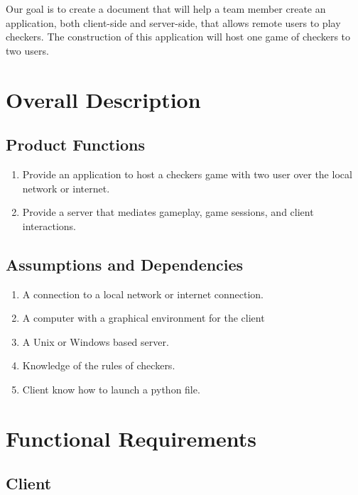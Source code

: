 \documentclass[10pt]{article}
\begin{document}
Our goal is to create a document that will help a team member create an application, 
both client-side and server-side, that allows remote users to play checkers. The construction of this application will host one game of checkers to two users. 
\section{Overall Description}

\subsection{Product Functions}

\begin{enumerate}
    \item Provide an application to host a checkers game with two user over the local network or internet.
    \item Provide a server that mediates gameplay, game sessions, and client interactions.
\end{enumerate}

\subsection{Assumptions and Dependencies}

\begin{enumerate}
    \item A connection to a local network or internet connection.
    \item A computer with a graphical environment for the client
    \item A Unix or Windows based server.
    \item Knowledge of the rules of checkers.
    \item Client know how to launch a python file.
\end{enumerate}

\section{Functional Requirements}

\subsection{Client}
\end{document}
